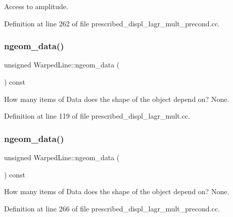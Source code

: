 Access to amplitude. 



Definition at line 262 of file prescribed\+\_\+displ\+\_\+lagr\+\_\+mult\+\_\+precond.\+cc.

\mbox{\label{classWarpedLine_aa4157cd4ff2e80f33b106b7ed4e4d804}} 
\subsubsection{\texorpdfstring{ngeom\+\_\+data()}{ngeom\_data()}\hspace{0.1cm}{\footnotesize\ttfamily [1/2]}}
{\footnotesize\ttfamily unsigned Warped\+Line\+::ngeom\+\_\+data (\begin{DoxyParamCaption}{ }\end{DoxyParamCaption}) const\hspace{0.3cm}{\ttfamily [inline]}}



How many items of Data does the shape of the object depend on? None. 



Definition at line 119 of file prescribed\+\_\+displ\+\_\+lagr\+\_\+mult.\+cc.

\mbox{\label{classWarpedLine_aa4157cd4ff2e80f33b106b7ed4e4d804}} 
\subsubsection{\texorpdfstring{ngeom\+\_\+data()}{ngeom\_data()}\hspace{0.1cm}{\footnotesize\ttfamily [2/2]}}
{\footnotesize\ttfamily unsigned Warped\+Line\+::ngeom\+\_\+data (\begin{DoxyParamCaption}{ }\end{DoxyParamCaption}) const\hspace{0.3cm}{\ttfamily [inline]}}



How many items of Data does the shape of the object depend on? None. 



Definition at line 266 of file prescribed\+\_\+displ\+\_\+lagr\+\_\+mult\+\_\+precond.\+cc.




